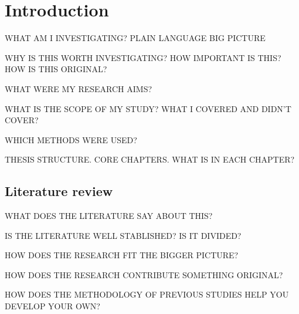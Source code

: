\chapter{Introduction}%
\label{ch:introduction}

WHAT AM I INVESTIGATING?
PLAIN LANGUAGE
BIG PICTURE

WHY IS THIS WORTH INVESTIGATING?
HOW IMPORTANT IS THIS?
HOW IS THIS ORIGINAL?

WHAT WERE MY RESEARCH AIMS?

WHAT IS THE SCOPE OF MY STUDY?
WHAT I COVERED AND DIDN'T COVER?

WHICH METHODS WERE USED?

THESIS STRUCTURE.
CORE CHAPTERS.
WHAT IS IN EACH CHAPTER?


\section{Literature review}%
\label{sec:literature-review}

WHAT DOES THE LITERATURE SAY ABOUT THIS?

IS THE LITERATURE WELL STABLISHED?
IS IT DIVIDED?

HOW DOES THE RESEARCH FIT THE BIGGER PICTURE?

HOW DOES THE RESEARCH CONTRIBUTE SOMETHING ORIGINAL?

HOW DOES THE METHODOLOGY OF PREVIOUS STUDIES HELP YOU DEVELOP YOUR OWN?